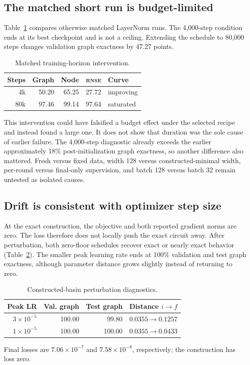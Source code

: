\documentclass[10pt,twocolumn]{article}
\newcommand{\rnse}{\textsc{rnse}}
\begin{document}
\subsection{The matched short run is budget-limited}

Table~\ref{tab:budget} compares otherwise matched LayerNorm runs. The
4,000-step condition ends at its best checkpoint and is not a ceiling.
Extending the schedule to 80,000 steps changes validation graph exactness by
47.27 points.

\begin{table}[t]
\centering
\caption{Matched training-horizon intervention.}
\label{tab:budget}
\small
\begin{tabular}{rrrrl}
\toprule
Steps & Graph & Node & \rnse{} & Curve \\
\midrule
4k  & 50.20 & 65.25 & 27.72 & improving \\
80k & 97.46 & 99.14 & 97.64 & saturated \\
\bottomrule
\end{tabular}
\end{table}

This intervention could have falsified a budget effect under the selected
recipe and instead found a large one. It does not show that duration was the
sole cause of earlier failure. The 4,000-step diagnostic already exceeds the
earlier approximately 18\% post-initialization graph exactness, so another
difference also mattered. Fresh versus fixed data, width 128 versus
constructed-minimal width, per-round versus final-only supervision, and batch
128 versus batch 32 remain untested as isolated causes.

\subsection{Drift is consistent with optimizer step size}

At the exact construction, the objective and both reported gradient norms are
zero. The loss therefore does not locally push the exact circuit away. After
perturbation, both zero-floor schedules recover exact or nearly exact behavior
(Table~\ref{tab:drift}). The smaller peak learning rate ends at 100\%
validation and test graph exactness, although parameter distance grows
slightly instead of returning to zero.

\begin{table}[t]
\centering
\caption{Constructed-basin perturbation diagnostics.}
\label{tab:drift}
\small
\begin{tabular}{rrrr}
\toprule
Peak LR & Val. graph & Test graph & Distance \(i\to f\) \\
\midrule
\(3{\times}10^{-5}\) & 100.00 & 99.80 & \(0.0355\to0.1257\) \\
\(1{\times}10^{-5}\) & 100.00 & 100.00 & \(0.0355\to0.0433\) \\
\bottomrule
\end{tabular}
\vspace{2pt}

\footnotesize Final losses are \(7.06{\times}10^{-7}\) and
\(7.58{\times}10^{-8}\), respectively; the construction has loss zero.
\end{table}
\end{document}
